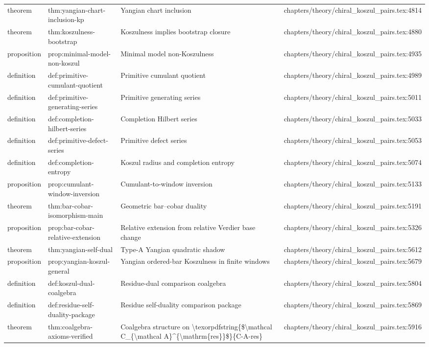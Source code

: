 \documentclass[11pt]{article}
\begin{document}
\begin{longtable}{L{0.10\textwidth}L{0.26\textwidth}L{0.42\textwidth}L{0.22\textwidth}}
theorem & thm:yangian-chart-inclusion-kp & Yangian chart inclusion & chapters/theory/chiral\_koszul\_pairs.tex:4814\\
theorem & thm:koszulness-bootstrap & Koszulness implies bootstrap closure & chapters/theory/chiral\_koszul\_pairs.tex:4880\\
proposition & prop:minimal-model-non-koszul & Minimal model non-Koszulness & chapters/theory/chiral\_koszul\_pairs.tex:4935\\
definition & def:primitive-cumulant-quotient & Primitive cumulant quotient & chapters/theory/chiral\_koszul\_pairs.tex:4989\\
definition & def:primitive-generating-series & Primitive generating series & chapters/theory/chiral\_koszul\_pairs.tex:5011\\
definition & def:completion-hilbert-series & Completion Hilbert series & chapters/theory/chiral\_koszul\_pairs.tex:5033\\
definition & def:primitive-defect-series & Primitive defect series & chapters/theory/chiral\_koszul\_pairs.tex:5053\\
definition & def:completion-entropy & Koszul radius and completion entropy & chapters/theory/chiral\_koszul\_pairs.tex:5074\\
proposition & prop:cumulant-window-inversion & Cumulant-to-window inversion & chapters/theory/chiral\_koszul\_pairs.tex:5133\\
theorem & thm:bar-cobar-isomorphism-main & Geometric bar--cobar duality & chapters/theory/chiral\_koszul\_pairs.tex:5191\\
proposition & prop:bar-cobar-relative-extension & Relative extension from relative Verdier base change & chapters/theory/chiral\_koszul\_pairs.tex:5326\\
theorem & thm:yangian-self-dual & Type-A Yangian quadratic shadow & chapters/theory/chiral\_koszul\_pairs.tex:5612\\
proposition & prop:yangian-koszul-general & Yangian ordered-bar Koszulness in finite windows & chapters/theory/chiral\_koszul\_pairs.tex:5679\\
definition & def:koszul-dual-coalgebra & Residue-dual comparison coalgebra & chapters/theory/chiral\_koszul\_pairs.tex:5804\\
definition & def:residue-self-duality-package & Residue self-duality comparison package & chapters/theory/chiral\_koszul\_pairs.tex:5869\\
theorem & thm:coalgebra-axioms-verified & Coalgebra structure on \textbackslash{}texorpdfstring\{\$\textbackslash{}mathcal C\_\{\textbackslash{}mathcal A\}\textasciicircum{}\{\textbackslash{}mathrm\{res\}\}\$\}\{C-A-res\} & chapters/theory/chiral\_koszul\_pairs.tex:5916\\

\end{longtable}
\end{document}
